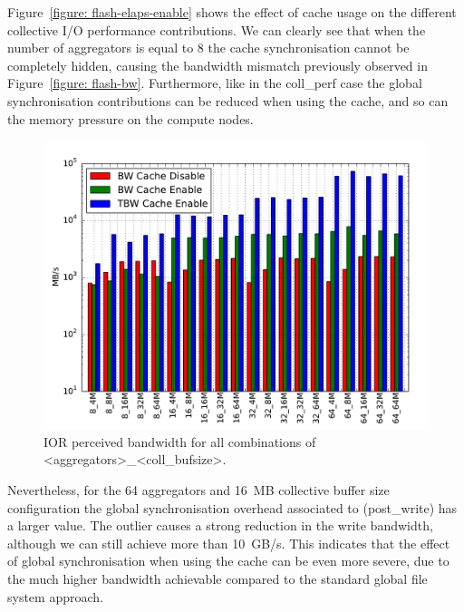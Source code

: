 Figure~\ref{figure: flash-elaps-enable} shows the effect of cache usage on the different collective I/O performance contributions. We can clearly see that when the number of aggregators is equal to 8 the cache synchronisation cannot be completely hidden, causing the bandwidth mismatch previously observed in Figure~\ref{figure: flash-bw}. Furthermore, like in the coll\_perf case the global synchronisation contributions can be reduced when using the cache, and so can the memory pressure on the compute nodes.
\begin{figure}[htb]
  \centering
  \includegraphics[width=0.95\columnwidth]{figures/ior_32GB_30sec_bw}
  \caption{IOR perceived bandwidth for all combinations of <aggregators>\_<coll\_bufsize>.} %
  \label{figure: ior-bw}
\end{figure}
Nevertheless, for the 64 aggregators and 16~MB collective buffer size configuration the global synchronisation overhead associated to  (post\_write) has a larger value. The outlier causes a strong reduction in the write bandwidth, although we can still achieve more than 10~GB/s. This indicates that the effect of global synchronisation when using the cache can be even more severe, due to the much higher bandwidth achievable compared to the standard global file system approach.

